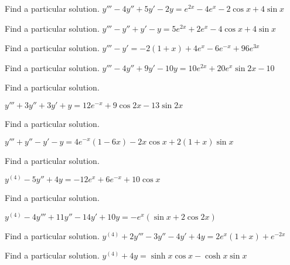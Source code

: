 \documentclass{ximera}
\begin{document}
\begin{problem}\label{exer:9.3.48}   Find a particular solution.   $y'''-4y''+5y'-2y=e^{2x}-4e^x-2\cos x+4\sin x$
\end{problem}

\begin{problem}\label{exer:9.3.49}   Find a particular solution.   $y'''-y''+y'-y=5e^{2x}+2e^x-4\cos x+4\sin x$
\end{problem}

\begin{problem}\label{exer:9.3.50}   Find a particular solution.   $y'''-y'=-2(1+x)+4e^x-6e^{-x}+96e^{3x}$
\end{problem}

\begin{problem}\label{exer:9.3.51}   Find a particular solution.   $y'''-4y''+9y'-10y=10e^{2x}+20e^x\sin2x-10$
\end{problem}

\begin{problem}\label{exer:9.3.52}   Find a particular solution.

$y'''+3y''+3y'+y=12e^{-x}+9\cos2x-13\sin2x$
\end{problem}

\begin{problem}\label{exer:9.3.53}   Find a particular solution.

$y'''+y''-y'-y=4e^{-x}(1-6x)-2x\cos x+2(1+x)\sin
x $
\end{problem}

\begin{problem}\label{exer:9.3.54}   Find a particular solution.

$y^{(4)}-5y''+4y=-12e^x+6e^{-x}+10\cos x$
\end{problem}

\begin{problem}\label{exer:9.3.55}   Find a particular solution.

$y^{(4)}-4y'''+11y''-14y'+10y=-e^x(\sin
x+2\cos2x)$
\end{problem}

\begin{problem}\label{exer:9.3.56}   Find a particular solution.   $y^{(4)}+2y'''-3y''-4y'+4y=2e^x(1+x)+e^{-2x}$
\end{problem}

\begin{problem}\label{exer:9.3.57}   Find a particular solution.   $y^{(4)}+4y=\sinh x\cos x-\cosh x\sin x$
\end{problem}
\end{document}
